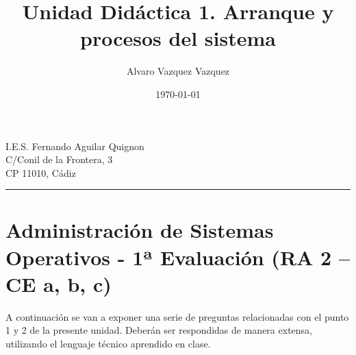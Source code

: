 \documentclass[a4paper,12pt]{article}
\title{Unidad Didáctica 1. Arranque y procesos del sistema}
\author{Alvaro Vazquez Vazquez}
\date{\today}
\begin{document}
\maketitle

\noindent
I.E.S. Fernando Aguilar Quignon \\
C/Conil de la Frontera, 3 \\
CP 11010, Cádiz \\
\hrule

\section*{Administración de Sistemas Operativos - 1ª Evaluación (RA 2 – CE a, b, c)}
A continuación se van a exponer una serie de preguntas relacionadas con el punto 1 y 2 de la presente unidad. Deberán ser respondidas de manera extensa, utilizando el lenguaje técnico aprendido en clase.  
\end{document}
